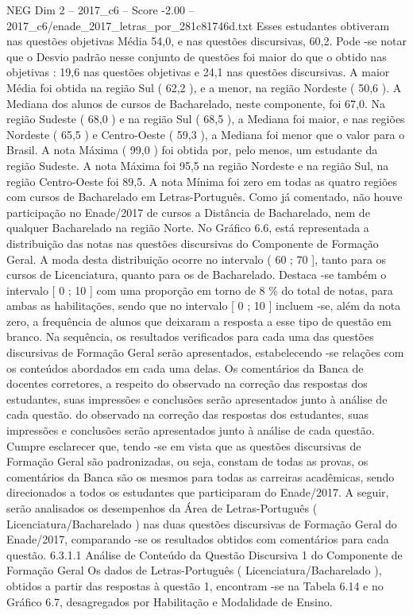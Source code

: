 \begin{textsample}{NEG Dim 2 – 2017\_c6 – Score -2.00 – 2017\_c6/enade\_2017\_letras\_por\_281c81746d.txt}
Esses estudantes obtiveram nas questões objetivas Média 54,0, e nas questões discursivas, 60,2.
Pode -se notar que o Desvio padrão nesse conjunto de questões foi maior do que o obtido nas objetivas : 19,6 nas questões objetivas e 24,1 nas questões discursivas.
A maior Média foi obtida na região Sul ( 62,2 ), e a menor, na região Nordeste ( 50,6 ).
A Mediana dos alunos de cursos de Bacharelado, neste componente, foi 67,0.
Na região Sudeste ( 68,0 ) e na região Sul ( 68,5 ), a Mediana foi maior, e nas regiões Nordeste ( 65,5 ) e Centro-Oeste ( 59,3 ), a Mediana foi menor que o valor para o Brasil.
A nota Máxima ( 99,0 ) foi obtida por, pelo menos, um estudante da região Sudeste.
A nota Máxima foi 95,5 na região Nordeste e na região Sul, na região Centro-Oeste foi 89,5.
A nota Mínima foi zero em todas as quatro regiões com cursos de Bacharelado em Letras-Português.
Como já comentado, não houve participação no Enade/2017 de cursos a Distância de Bacharelado, nem de qualquer Bacharelado na região Norte.
No Gráfico 6.6, está representada a distribuição das notas nas questões discursivas do Componente de Formação Geral.
A moda desta distribuição ocorre no intervalo ( 60 ; 70 ], tanto para os cursos de Licenciatura, quanto para os de Bacharelado.
Destaca -se também o intervalo [ 0 ; 10 ] com uma proporção em torno de 8 \% do total de notas, para ambas as habilitações, sendo que no intervalo [ 0 ; 10 ] incluem -se, além da nota zero, a frequência de alunos que deixaram a resposta a esse tipo de questão em branco.
Na sequência, os resultados verificados para cada uma das questões discursivas de Formação Geral serão apresentados, estabelecendo -se relações com os conteúdos abordados em cada uma delas.
Os comentários da Banca de docentes corretores, a respeito do observado na correção das respostas dos estudantes, suas impressões e conclusões serão apresentados junto à análise de cada questão. do observado na correção das respostas dos estudantes, suas impressões e conclusões serão apresentados junto à análise de cada questão.
Cumpre esclarecer que, tendo -se em vista que as questões discursivas de Formação Geral são padronizadas, ou seja, constam de todas as provas, os comentários da Banca são os mesmos para todas as carreiras acadêmicas, sendo direcionados a todos os estudantes que participaram do Enade/2017.
A seguir, serão analisados os desempenhos da Área de Letras-Português ( Licenciatura/Bacharelado ) nas duas questões discursivas de Formação Geral do Enade/2017, comparando -se os resultados obtidos com comentários para cada questão. 6.3.1.1 Análise de Conteúdo da Questão Discursiva 1 do Componente de Formação Geral Os dados de Letras-Português ( Licenciatura/Bacharelado ), obtidos a partir das respostas à questão 1, encontram -se na Tabela 6.14 e no Gráfico 6.7, desagregados por Habilitação e Modalidade de Ensino.

\end{textsample}
